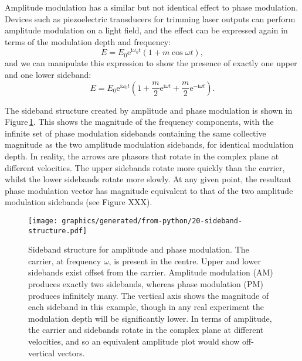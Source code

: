 Amplitude modulation has a similar but not identical effect to phase modulation. Devices such as piezoelectric transducers for trimming laser outputs can perform amplitude modulation on a light field, and the effect can be expressed again in terms of the modulation depth and frequency:
\begin{equation}
  E = E_0 \text{e}^{\text{i} \omega_0 t} \left( 1 + m \cos{\omega t} \right),
\end{equation}
and we can manipulate this expression to show the presence of exactly one upper and one lower sideband:
\begin{equation}
  \label{eq:field-amp-mod}
  E = E_0 \text{e}^{\text{i} \omega_0 t} \left( 1 + \frac{m}{2} \text{e}^{\text{i} \omega t} + \frac{m}{2} \text{e}^{-\text{i} \omega t} \right).
\end{equation}

The sideband structure created by amplitude and phase modulation is shown in Figure\,\ref{fig:sideband-structure}. This shows the magnitude of the frequency components, with the infinite set of phase modulation sidebands containing the same collective magnitude as the two amplitude modulation sidebands, for identical modulation depth. In reality, the arrows are phasors that rotate in the complex plane at different velocities. The upper sidebands rotate more quickly than the carrier, whilst the lower sidebands rotate more slowly. At any given point, the resultant phase modulation vector has magnitude equivalent to that of the two amplitude modulation sidebands (see Figure XXX).

\begin{figure}
  \centering
  \texttt{[image: graphics/generated/from-python/20-sideband-structure.pdf]}
  \caption{Sideband structure for amplitude and phase modulation. The carrier, at frequency $\omega$, is present in the centre. Upper and lower sidebands exist offset from the carrier. Amplitude modulation (AM) produces exactly two sidebands, whereas phase modulation (PM) produces infinitely many. The vertical axis shows the magnitude of each sideband in this example, though in any real experiment the modulation depth will be significantly lower. In terms of amplitude, the carrier and sidebands rotate in the complex plane at different velocities, and so an equivalent amplitude plot would show off-vertical vectors.}
  \label{fig:sideband-structure}
\end{figure}


